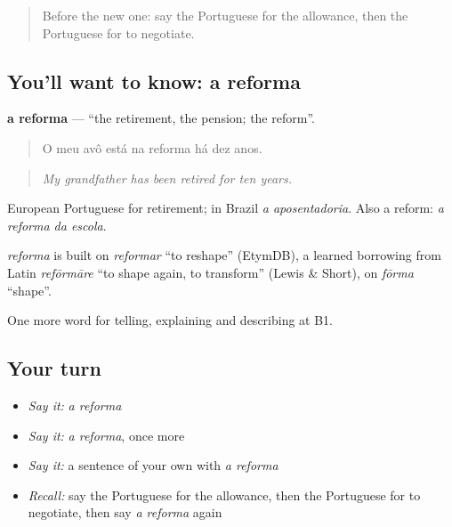\begin{quote}
Before the new one: say the Portuguese for the allowance, then the Portuguese for to negotiate.
\end{quote}

\subsection*{You'll want to know: a reforma}
\textbf{a reforma} — \textquotedblleft{}the retirement, the pension; the reform\textquotedblright{}.

\begin{quote}
O meu avô está na reforma há dez anos.
\end{quote}

\begin{quote}
\emph{My grandfather has been retired for ten years.}
\end{quote}

European Portuguese for retirement; in Brazil \emph{a aposentadoria}. Also a reform: \emph{a reforma da escola}.

\begin{cousinweb}
\emph{reforma} is built on \emph{reformar} \textquotedblleft{}to reshape\textquotedblright{} (EtymDB), a learned borrowing from Latin \emph{refōrmāre} \textquotedblleft{}to shape again, to transform\textquotedblright{} (Lewis \& Short), on \emph{fōrma} \textquotedblleft{}shape\textquotedblright{}.
\end{cousinweb}

\begin{grammarlens}[title={What you've built}]
One more word for telling, explaining and describing at B1.
\end{grammarlens}

\subsection*{Your turn}
\begin{itemize}
\raggedright
  \item \emph{Say it:} \emph{a reforma}
  \item \emph{Say it:} \emph{a reforma}, once more
  \item \emph{Say it:} a sentence of your own with \emph{a reforma}
  \item \emph{Recall:} say the Portuguese for the allowance, then the Portuguese for to negotiate, then say \emph{a reforma} again
\end{itemize}

